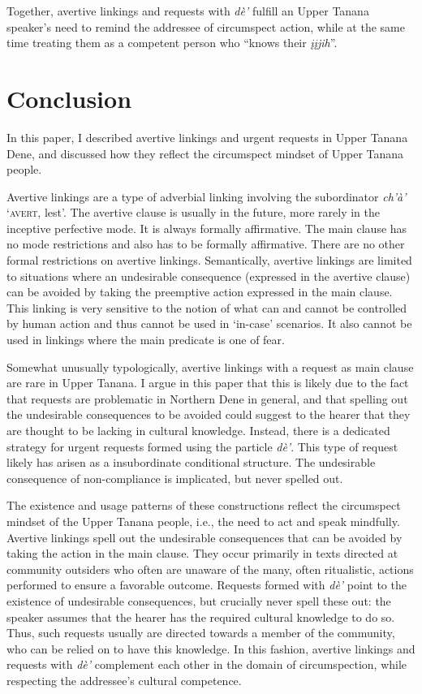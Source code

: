 \documentclass[output=paper,colorlinks,citecolor=brown
]{langscibook}
\begin{document}
Together, avertive linkings and requests with \textit{dè'} fulfill an Upper Tanana speaker's need to remind the addressee of circumspect action, while at the same time treating them as a competent person who ``knows their \textit{įįjih}''. 



\section{Conclusion}
\label{section:conclusion}

In this paper, I described avertive linkings and urgent requests in Upper Tanana Dene, and discussed how they reflect the circumspect mindset of Upper Tanana people. 

Avertive linkings are a type of adverbial linking involving the subordinator \textit{ch'à'} `\textsc{avert}, lest'. The avertive clause is usually in the future, more rarely in the inceptive perfective mode. It is always formally affirmative. The main clause has no mode restrictions and also has to be formally affirmative. There are no other formal restrictions on avertive linkings. Semantically, avertive linkings are limited to situations where an undesirable consequence (expressed in the avertive clause) can be avoided by taking the preemptive action expressed in the main clause. This linking is very sensitive to the notion of what can and cannot be controlled by human action and thus cannot be used in `in-case' scenarios. It also cannot be used in linkings where the main predicate is one of fear. 

Somewhat unusually typologically, avertive linkings with a request as main clause are rare in Upper Tanana. I argue in this paper that this is likely due to the fact that requests are problematic in Northern Dene in general, and that spelling out the undesirable consequences to be avoided could suggest to the hearer that they are thought to be lacking in cultural knowledge. Instead, there is a dedicated strategy for urgent requests formed using the particle \textit{dè'}. This type of request likely has arisen as a insubordinate conditional structure. The undesirable consequence of non-compliance is implicated, but never spelled out.

The existence and usage patterns of these constructions reflect the circumspect mindset of the Upper Tanana people, i.e., the need to act and speak mindfully. Avertive linkings spell out the undesirable consequences that can be avoided by taking the action in the main clause. They occur primarily in texts directed at community outsiders who often are unaware of the many, often ritualistic, actions performed to ensure a favorable outcome. Requests formed with \textit{dè'} point to the existence of undesirable consequences, but crucially never spell these out: the speaker assumes that the hearer has the required cultural knowledge to do so. Thus, such requests usually are directed towards a member of the community, who can be relied on to have this knowledge. In this fashion, avertive linkings and requests with \textit{dè'} complement each other in the domain of circumspection, while respecting the addressee's cultural competence.
\end{document}
